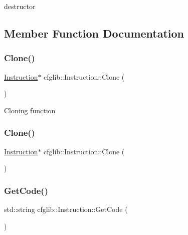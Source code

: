 destructor 

\subsection{Member Function Documentation}
\mbox{\label{classcfglib_1_1Instruction_a23db173ff853ab41327333fd8b87b61c}} 
\subsubsection{\texorpdfstring{Clone()}{Clone()}\hspace{0.1cm}{\footnotesize\ttfamily [1/2]}}
{\footnotesize\ttfamily \hyperlink{classcfglib_1_1Instruction}{Instruction}$\ast$ cfglib\+::\+Instruction\+::\+Clone (\begin{DoxyParamCaption}{ }\end{DoxyParamCaption})}

Cloning function \mbox{\label{classcfglib_1_1Instruction_a32a5438b8eb037f9551518679e1c576a}} 
\subsubsection{\texorpdfstring{Clone()}{Clone()}\hspace{0.1cm}{\footnotesize\ttfamily [2/2]}}
{\footnotesize\ttfamily \hyperlink{classcfglib_1_1Instruction}{Instruction}$\ast$ cfglib\+::\+Instruction\+::\+Clone (\begin{DoxyParamCaption}\item[{\hyperlink{classcfglib_1_1CloneHandle}{Clone\+Handle} \&}]{ }\end{DoxyParamCaption})}

\mbox{\label{classcfglib_1_1Instruction_a383f3ba3adf01b1596825b2314cdd5a9}} 
\subsubsection{\texorpdfstring{Get\+Code()}{GetCode()}}
{\footnotesize\ttfamily std\+::string cfglib\+::\+Instruction\+::\+Get\+Code (\begin{DoxyParamCaption}{ }\end{DoxyParamCaption})}

